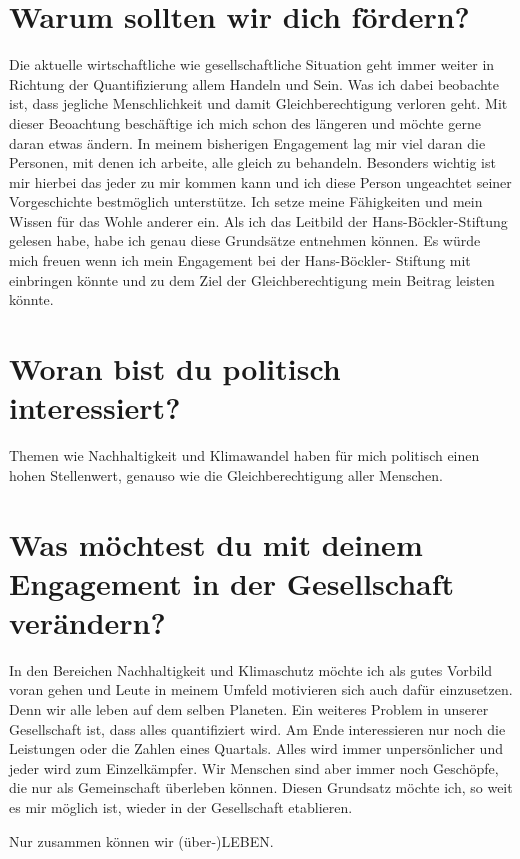 \documentclass[12pt]{scrreprt}
\begin{document}
\section*{Warum sollten wir dich fördern?}
Die aktuelle wirtschaftliche wie gesellschaftliche Situation geht immer weiter in Richtung der
Quantifizierung allem Handeln und Sein. Was ich dabei beobachte ist, dass jegliche Menschlichkeit
und damit Gleichberechtigung verloren geht. Mit dieser Beoachtung beschäftige ich mich
schon des längeren und möchte gerne daran etwas ändern. In meinem bisherigen Engagement
lag mir viel daran die Personen, mit denen ich arbeite, alle gleich zu behandeln. Besonders
wichtig ist mir hierbei das jeder zu mir kommen kann und ich diese Person ungeachtet seiner
Vorgeschichte bestmöglich unterstütze. Ich setze meine Fähigkeiten und mein Wissen für das
Wohle anderer ein.
Als ich das Leitbild der Hans-Böckler-Stiftung gelesen habe, habe ich genau diese Grundsätze
entnehmen können. Es würde mich freuen wenn ich mein Engagement bei der Hans-Böckler-
Stiftung mit einbringen könnte und zu dem Ziel der Gleichberechtigung mein Beitrag leisten
könnte.
\section*{Woran bist du politisch interessiert?}
Themen wie Nachhaltigkeit und Klimawandel haben für mich politisch einen hohen Stellenwert,
genauso wie die Gleichberechtigung aller Menschen.
\section*{Was möchtest du mit deinem Engagement in der Gesellschaft verändern?}
In den Bereichen Nachhaltigkeit und Klimaschutz möchte ich als gutes Vorbild voran gehen
und Leute in meinem Umfeld motivieren sich auch dafür einzusetzen. Denn wir alle leben auf
dem selben Planeten. Ein weiteres Problem in unserer Gesellschaft ist, dass alles quantifiziert
wird. Am Ende interessieren nur noch die Leistungen oder die Zahlen eines Quartals. Alles wird
immer unpersönlicher und jeder wird zum Einzelkämpfer. Wir Menschen sind aber immer noch
Geschöpfe, die nur als Gemeinschaft überleben können. Diesen Grundsatz möchte ich, so weit
es mir möglich ist, wieder in der Gesellschaft etablieren.

Nur zusammen können wir (über-)LEBEN.
\end{document}
